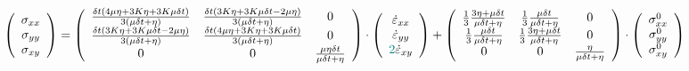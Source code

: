 \begin{mdframed}[backgroundcolor=blue!5]
\begin{equation}
\left(
\begin{array}{c}
\sigma_{xx}\\ 
\sigma_{yy}\\ 
\sigma_{xy} 
\end{array}
\right)
=
\left(
\begin{array}{ccc}
\frac{\delta t(4\mu \eta + 3K \eta+ 3K \mu\delta t)}{3(\mu \delta t + \eta)} &
\frac{\delta t(3K \eta+ 3K \mu\delta t - 2\mu \eta)}{3(\mu \delta t + \eta)} &
0 \\
\frac{\delta t(3K \eta+ 3K \mu\delta t  - 2\mu \eta)}{3(\mu \delta t + \eta)}&
\frac{\delta t(4\mu \eta + 3K \eta+ 3K \mu\delta t)}{3(\mu \delta t + \eta)} &
0  \\
0 & 0 & \frac{\mu \eta \delta t }{\mu \delta t + \eta}  \\
\end{array}
\right)
\cdot
\left(
\begin{array}{c}
\dot\varepsilon_{xx}\\ 
\dot\varepsilon_{yy}\\ 
{\color{teal}2}\dot\varepsilon_{xy} 
\end{array}
\right) 
+
\left(
\begin{array}{cccccc}
\frac13\frac{3\eta + \mu \delta t}{\mu\delta t+\eta} & 
\frac13\frac{\mu \delta t}{\mu\delta t+\eta} & 
0\\
\frac13\frac{\mu \delta t}{\mu\delta t+\eta} & 
\frac13\frac{3\eta + \mu \delta t}{\mu\delta t+\eta} & 
0\\
0 & 0 & \frac{ \eta}{\mu\delta t + \eta}  
\end{array}
\right)
\cdot
\left(
\begin{array}{c}
\sigma_{xx}^0\\ 
\sigma_{yy}^0\\ 
\sigma_{xy}^0 
\end{array}
\right) 
\label{eq_129_2D}
\end{equation}
\end{mdframed}

